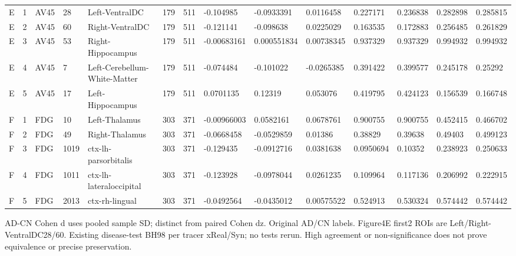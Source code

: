 \begin{landscape}
\begin{longtable}{llllllllllllll}
E & 1 & AV45 & 28 & Left-VentralDC & 179 & 511 & -0.104985 & -0.0933391 & 0.0116458 & 0.227171 & 0.236838 & 0.282898 & 0.285815 \\
E & 2 & AV45 & 60 & Right-VentralDC & 179 & 511 & -0.121141 & -0.098638 & 0.0225029 & 0.163535 & 0.172883 & 0.256485 & 0.261829 \\
E & 3 & AV45 & 53 & Right-Hippocampus & 179 & 511 & -0.00683161 & 0.000551834 & 0.00738345 & 0.937329 & 0.937329 & 0.994932 & 0.994932 \\
E & 4 & AV45 & 7 & Left-Cerebellum-White-Matter & 179 & 511 & -0.074484 & -0.101022 & -0.0265385 & 0.391422 & 0.399577 & 0.245178 & 0.25292 \\
E & 5 & AV45 & 17 & Left-Hippocampus & 179 & 511 & 0.0701135 & 0.12319 & 0.053076 & 0.419795 & 0.424123 & 0.156539 & 0.166748 \\
F & 1 & FDG & 10 & Left-Thalamus & 303 & 371 & -0.00966003 & 0.0582161 & 0.0678761 & 0.900755 & 0.900755 & 0.452415 & 0.466702 \\
F & 2 & FDG & 49 & Right-Thalamus & 303 & 371 & -0.0668458 & -0.0529859 & 0.01386 & 0.38829 & 0.39638 & 0.49403 & 0.499123 \\
F & 3 & FDG & 1019 & ctx-lh-parsorbitalis & 303 & 371 & -0.129435 & -0.0912716 & 0.0381638 & 0.0950694 & 0.10352 & 0.238923 & 0.250633 \\
F & 4 & FDG & 1011 & ctx-lh-lateraloccipital & 303 & 371 & -0.123928 & -0.0978044 & 0.0261235 & 0.109964 & 0.117136 & 0.206992 & 0.222915 \\
F & 5 & FDG & 2013 & ctx-rh-lingual & 303 & 371 & -0.0492564 & -0.0435012 & 0.00575522 & 0.524913 & 0.530324 & 0.574442 & 0.574442 \\
\end{longtable}
\noindent\parbox{\linewidth}{\footnotesize AD-CN Cohen d uses pooled sample SD; distinct from paired Cohen dz. Original AD/CN labels. Figure4E first2 ROIs are Left/Right-VentralDC28/60. Existing disease-test BH98 per tracer xReal/Syn; no tests rerun. High agreement or non-significance does not prove equivalence or precise preservation.}
\endgroup
\end{landscape}
